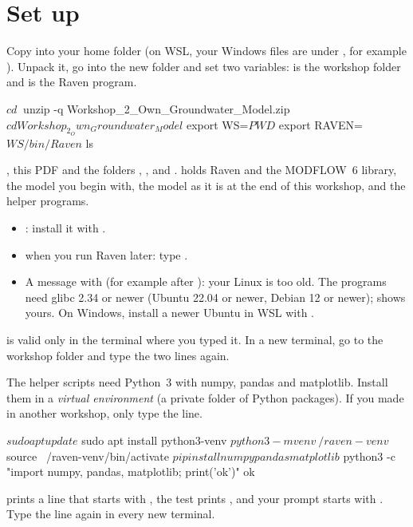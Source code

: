 \section{Set up}

\label{st:unpack}
Copy  into your home folder (on WSL, your Windows files are under
, for example ). Unpack it, go into the new folder and set two
variables:  is the workshop folder and  is the Raven program.
\begin{shell}
$ cd ~
$ unzip -q Workshop_2_Own_Groundwater_Model.zip
$ cd Workshop_2_Own_Groundwater_Model
$ export WS=$PWD
$ export RAVEN=$WS/bin/Raven
$ ls
\end{shell}
\see {}, this PDF and the folders , ,  and .  holds Raven and the MODFLOW~6 library,  the model you begin with,
 the model as it is at the end of this workshop, and  the helper programs.
\begin{trouble}
\begin{itemize}
\item {}: install it with .
\item {} when you run Raven later: type .
\item A message with  (for example after ): your Linux is too old. The programs need glibc 2.34 or newer (Ubuntu 22.04 or newer, Debian 12 or newer);  shows yours. On Windows, install a newer Ubuntu in WSL with .
\end{itemize}
\end{trouble}
\begin{note}
 is valid only in the terminal where you typed it. In a new terminal, go to the workshop folder and type the
two  lines again.
\end{note}

\label{st:python}
The helper scripts need Python~3 with numpy, pandas and matplotlib. Install them in a \emph{virtual environment} (a private
folder of Python packages). If you made  in another workshop, only type the
 line.
\begin{shell}
$ sudo apt update
$ sudo apt install python3-venv
$ python3 -m venv ~/raven-venv
$ source ~/raven-venv/bin/activate
$ pip install numpy pandas matplotlib
$ python3 -c "import numpy, pandas, matplotlib; print('ok')"
ok
\end{shell}
\see {} prints a line that starts with , the test prints , and your prompt starts
with . Type the  line again in every new terminal.
